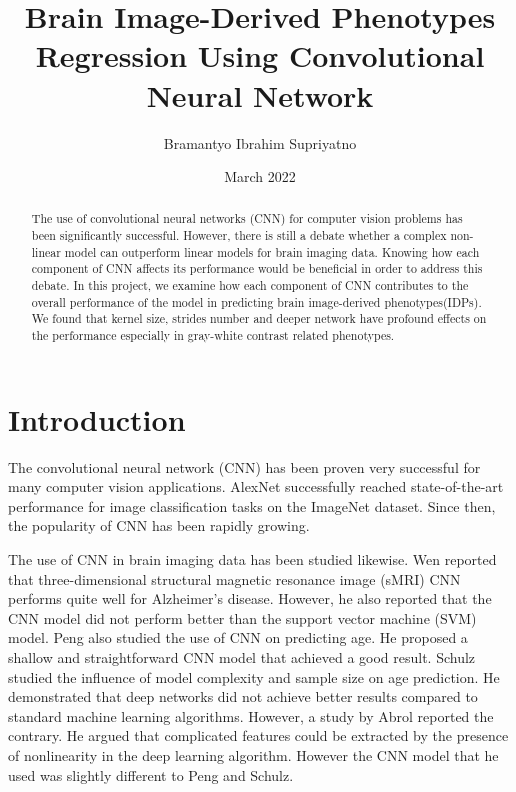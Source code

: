 \documentclass{article}
\title{Brain Image-Derived Phenotypes Regression Using Convolutional Neural Network}
\author{Bramantyo Ibrahim Supriyatno}
\date{March 2022}
\begin{document}
    \maketitle
    \begin{abstract}
        The use of convolutional neural networks (CNN) for computer vision problems has been significantly successful. 
        However, there is still a debate whether a complex non-linear model can outperform linear models for brain imaging data. 
        Knowing how each component of CNN affects its performance would be beneficial in order to address this debate. 
        In this project, we examine how each component of CNN contributes to the overall performance of the model in predicting brain image-derived phenotypes(IDPs). 
        We found that kernel size, strides number and deeper network have profound effects on the performance especially in gray-white contrast related phenotypes. 
    \end{abstract}
    

    \section*{Introduction}
    The convolutional neural network (CNN) has been proven very successful for many computer vision applications. 
    AlexNet\cite{alexnet} successfully reached state-of-the-art performance for image classification tasks on the ImageNet dataset. 
    Since then, the popularity of CNN has been rapidly growing.
    
    The use of CNN in brain imaging data has been studied likewise. 
    Wen\cite{wen} reported that three-dimensional structural magnetic resonance image (sMRI) CNN performs quite well for Alzheimer's disease. 
    However, he also reported that the CNN model did not perform better than the support vector machine (SVM) model. 
    Peng\cite{peng} also studied the use of CNN on predicting age. He proposed a shallow and straightforward CNN model that achieved a good result. 
    Schulz\cite{schulz} studied the influence of model complexity and sample size on age prediction. 
    He demonstrated that deep networks did not achieve better results compared to standard machine learning algorithms. 
    However, a study by Abrol\cite{abrol} reported the contrary. 
    He argued that complicated features could be extracted by the presence of nonlinearity in the deep learning algorithm. 
    However the CNN model that he used was slightly different to Peng and Schulz. 
        
\end{document}
